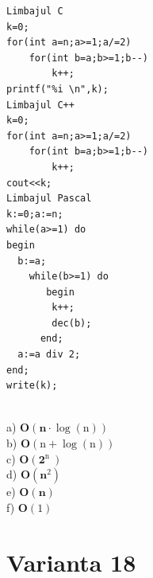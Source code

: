 {{\begin{verbatim}
Limbajul C
k=0;
for(int a=n;a>=1;a/=2)
    for(int b=a;b>=1;b--)
        k++;
printf("%i \n",k);
Limbajul C++
k=0;
for(int a=n;a>=1;a/=2)
    for(int b=a;b>=1;b--)
        k++;
cout<<k;
Limbajul Pascal 
k:=0;a:=n; 
while(a>=1) do  
begin 
  b:=a; 
    while(b>=1) do 
       begin 
        k++; 
        dec(b); 
      end; 
  a:=a div 2; 
end; 
write(k);
\end{verbatim}
\\
a) $\mathbf{O}(\mathbf{n} \cdot \log (\mathrm{n}))$
\\
b) $\mathbf{O}(\mathrm{n}+\log (\mathrm{n}))$
\\
c) $\mathbf{O}\left(\mathbf{2}^{\text {n }}\right)$
\\
d) $\mathbf{O}\left(\mathbf{n}^{2}\right)$
\\
e) $\mathbf{O}(\mathbf{n})$
\\
f) $\mathbf{O}(1)$
\\

\section*{Varianta 18}

}}
